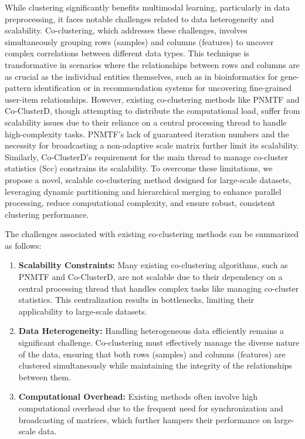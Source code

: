 \documentclass[journal]{IEEEtran}
\begin{document}
While clustering significantly benefits multimodal learning, particularly in data preprocessing, it faces notable challenges related to data heterogeneity and scalability. Co-clustering, which addresses these challenges, involves simultaneously grouping rows (samples) and columns (features) to uncover complex correlations between different data types. This technique is transformative in scenarios where the relationships between rows and columns are as crucial as the individual entities themselves, such as in bioinformatics for gene-pattern identification or in recommendation systems for uncovering fine-grained user-item relationships. However, existing co-clustering methods like PNMTF and Co-ClusterD, though attempting to distribute the computational load, suffer from scalability issues due to their reliance on a central processing thread to handle high-complexity tasks. PNMTF's lack of guaranteed iteration numbers and the necessity for broadcasting a non-adaptive scale matrix further limit its scalability. Similarly, Co-ClusterD's requirement for the main thread to manage co-cluster statistics (Scc) constrains its scalability. To overcome these limitations, we propose a novel, scalable co-clustering method designed for large-scale datasets, leveraging dynamic partitioning and hierarchical merging to enhance parallel processing, reduce computational complexity, and ensure robust, consistent clustering performance.

The challenges associated with existing co-clustering methods can be summarized as follows:

\begin{enumerate}
  \item \textbf{Scalability Constraints:} Many existing co-clustering algorithms, such as PNMTF and Co-ClusterD, are not scalable due to their dependency on a central processing thread that handles complex tasks like managing co-cluster statistics. This centralization results in bottlenecks, limiting their applicability to large-scale datasets.
  \item \textbf{Data Heterogeneity:} Handling heterogeneous data efficiently remains a significant challenge. Co-clustering must effectively manage the diverse nature of the data, ensuring that both rows (samples) and columns (features) are clustered simultaneously while maintaining the integrity of the relationships between them.
  \item \textbf{Computational Overhead:} Existing methods often involve high computational overhead due to the frequent need for synchronization and broadcasting of matrices, which further hampers their performance on large-scale data.
\end{enumerate}
\end{document}
